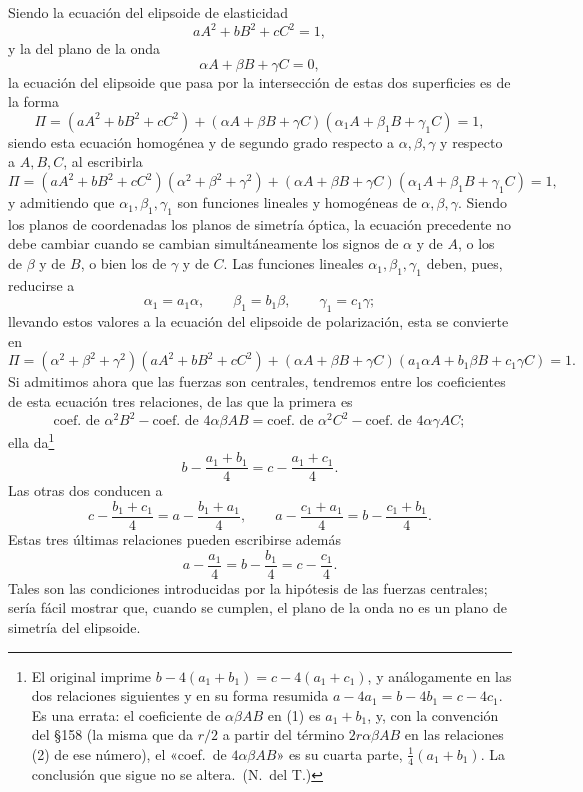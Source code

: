 Siendo la ecuación del elipsoide de elasticidad
\[
aA^2+bB^2+cC^2=1,
\]
y la del plano de la onda
\[
\alpha A+\beta B+\gamma C=0,
\]
la ecuación del elipsoide que pasa por la intersección de estas dos
superficies es de la forma
\[
\Pi=(aA^2+bB^2+cC^2)+(\alpha A+\beta B+\gamma C)(\alpha_1 A+\beta_1 B+\gamma_1 C)=1,
\]
siendo esta ecuación homogénea y de segundo grado respecto a
$\alpha,\beta,\gamma$ y respecto a $A,B,C$, al escribirla
\[
\Pi=(aA^2+bB^2+cC^2)(\alpha^2+\beta^2+\gamma^2)
+(\alpha A+\beta B+\gamma C)(\alpha_1 A+\beta_1 B+\gamma_1 C)=1,
\]
y admitiendo que $\alpha_1,\beta_1,\gamma_1$ son funciones lineales y
homogéneas de $\alpha,\beta,\gamma$. Siendo los planos de coordenadas los
planos de simetría óptica, la ecuación precedente no debe cambiar cuando
se cambian simultáneamente los signos de $\alpha$ y de $A$, o los de
$\beta$ y de $B$, o bien los de $\gamma$ y de $C$. Las funciones lineales
$\alpha_1,\beta_1,\gamma_1$ deben, pues, reducirse a
\[
\alpha_1=a_1\alpha,\qquad \beta_1=b_1\beta,\qquad \gamma_1=c_1\gamma;
\]
llevando estos valores a la ecuación del elipsoide de polarización, esta
se convierte en
\begin{equation}
\Pi=(\alpha^2+\beta^2+\gamma^2)(aA^2+bB^2+cC^2)
+(\alpha A+\beta B+\gamma C)(a_1\alpha A+b_1\beta B+c_1\gamma C)=1.
\tag{1}
\end{equation}
Si admitimos ahora que las fuerzas son centrales, tendremos entre los
coeficientes de esta ecuación tres relaciones, de las que la primera es
\[
\text{coef. de }\alpha^2B^2-\text{coef. de }4\alpha\beta AB
=\text{coef. de }\alpha^2C^2-\text{coef. de }4\alpha\gamma AC;
\]
ella da\footnote{El original imprime $b-4(a_1+b_1)=c-4(a_1+c_1)$, y
análogamente en las dos relaciones siguientes y en su forma resumida
$a-4a_1=b-4b_1=c-4c_1$. Es una errata: el coeficiente de $\alpha\beta AB$
en (1) es $a_1+b_1$, y, con la convención del §158
(la misma que da $r/2$ a partir del término $2r\alpha\beta AB$ en las
relaciones (2) de ese número), el «coef.\ de $4\alpha\beta AB$» es su
cuarta parte, $\frac14(a_1+b_1)$. La conclusión que sigue no se altera.~(N.~del T.)}
\[
b-\frac{a_1+b_1}{4}=c-\frac{a_1+c_1}{4}.
\]
Las otras dos conducen a
\[
c-\frac{b_1+c_1}{4}=a-\frac{b_1+a_1}{4},\qquad
a-\frac{c_1+a_1}{4}=b-\frac{c_1+b_1}{4}.
\]
Estas tres últimas relaciones pueden escribirse además
\[
a-\frac{a_1}{4}=b-\frac{b_1}{4}=c-\frac{c_1}{4}.
\]
Tales son las condiciones introducidas por la hipótesis de las fuerzas
centrales; sería fácil mostrar que, cuando se cumplen, el plano de la onda
no es un plano de simetría del elipsoide.

